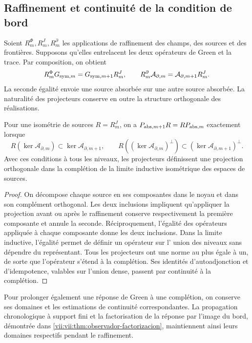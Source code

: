 \subsection{Raffinement et continuité de la condition de bord}
\label{vii:vii:subsec:refinamiento-absorcion}

Soient \(R_m^\Phi,R_m^J,R_m^\partial\) les applications de raffinement des
champs, des sources et des frontières. Supposons qu'elles entrelacent les deux opérateurs de Green et la
trace. Par composition, on obtient
\begin{equation}
 R_m^\Phi G_{{\rm sym},m}=G_{{\rm sym},m+1}R_m^J,\qquad
 R_m^\partial\mathcal A_{\partial,m}
 =\mathcal A_{\partial,m+1}R_m^J.
 \label{vii:vii:eq:refinamiento-lectura-absorcion}
\end{equation}
La seconde égalité envoie une source absorbée sur une autre source absorbée.
La naturalité des projecteurs conserve en outre la structure
orthogonale des réalisations.

\begin{proposition}
\label{vii:vii:prop:naturalidad-proyeccion-absorcion}
Pour une isométrie de sources \(R=R_m^J\), on a \(P_{{\rm abs},m+1}R=RP_{{\rm abs},m}\) exactement lorsque
\[
 R(\ker\mathcal A_{\partial,m})
       \subset\ker\mathcal A_{\partial,m+1},\qquad
 R((\ker\mathcal A_{\partial,m})^\perp)
       \subset(\ker\mathcal A_{\partial,m+1})^\perp.
\]
Avec ces conditions à tous les niveaux, les projecteurs définissent une projection orthogonale dans la complétion de la limite inductive isométrique des espaces de sources.
\end{proposition}
\begin{proof}
On décompose chaque source en ses composantes dans le noyau et dans son
complément orthogonal. Les deux inclusions impliquent qu'appliquer la
projection avant ou après le raffinement conserve respectivement la
première composante et annule la seconde. Réciproquement, l'égalité des
opérateurs appliquée à chaque composante donne les deux inclusions.
Dans la limite inductive, l'égalité permet de définir un opérateur sur l'
union des niveaux sans dépendre du représentant. Tous les projecteurs
ont une norme au plus égale à un, de sorte que l'opérateur s'étend à la
complétion. Ses identités d'autoadjonction et d'idempotence, valables sur
l'union dense, passent par continuité à la complétion.
\end{proof}

Pour prolonger également une réponse de Green à une complétion, on
conserve ses domaines et les estimations de continuité correspondantes.
La propagation chronologique à support fini et la factorisation de la
réponse par l'image du bord, démontrée dans
\ref{vii:vii:thm:observador-factorizacion}, maintiennent ainsi leurs domaines
respectifs pendant le raffinement.

